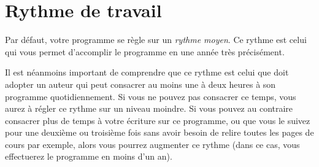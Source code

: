 % 
% 
% 
% 
% 
% 
% 
% 

\section{Rythme de travail}\hypertarget{rythme-travail}{}\label{rythme-travail}

Par défaut, votre programme se règle sur un \emph{rythme moyen}. Ce rythme est celui qui vous permet d'accomplir le programme en une année très précisément.

Il est néanmoins important de comprendre que ce rythme est celui que doit adopter un auteur qui peut consacrer au moins une à deux heures à son programme quotidiennement. Si vous ne pouvez pas consacrer ce temps, vous aurez à régler ce rythme sur un niveau moindre. Si vous pouvez au contraire consacrer plus de temps à votre écriture sur ce programme, ou que vous le suivez pour une deuxième ou troisième fois sans avoir besoin de relire toutes les pages de cours par exemple, alors vous pourrez augmenter ce rythme (dans ce cas, vous effectuerez le programme en moins d'un an).

